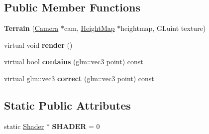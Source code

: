 \subsection*{Public Member Functions}
\begin{DoxyCompactItemize}
\item 
\hypertarget{class_terrain_a985fd8481311a5d894620ff6261ca121}{}{\bfseries Terrain} (\hyperlink{class_camera}{Camera} $\ast$cam, \hyperlink{class_height_map}{Height\+Map} $\ast$heightmap, G\+Luint texture)\label{class_terrain_a985fd8481311a5d894620ff6261ca121}

\item 
\hypertarget{class_terrain_a56992faf594dadfdf2264c2f524ea12f}{}virtual void {\bfseries render} ()\label{class_terrain_a56992faf594dadfdf2264c2f524ea12f}

\item 
\hypertarget{class_terrain_aa907bd34d0c4abc859d95b4908f40b3c}{}virtual bool {\bfseries contains} (glm\+::vec3 point) const \label{class_terrain_aa907bd34d0c4abc859d95b4908f40b3c}

\item 
\hypertarget{class_terrain_a60d6629d3e3e525b5af4a041a5513804}{}virtual glm\+::vec3 {\bfseries correct} (glm\+::vec3 point) const \label{class_terrain_a60d6629d3e3e525b5af4a041a5513804}

\end{DoxyCompactItemize}
\subsection*{Static Public Attributes}
\begin{DoxyCompactItemize}
\item 
\hypertarget{class_terrain_a7160426f9fec0a57393977601b3e62de}{}static \hyperlink{class_shader}{Shader} $\ast$ {\bfseries S\+H\+A\+D\+E\+R} = 0\label{class_terrain_a7160426f9fec0a57393977601b3e62de}

\end{DoxyCompactItemize}
